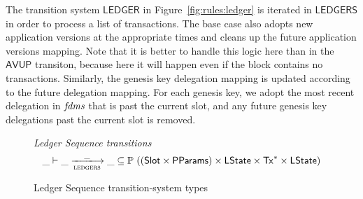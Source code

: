 \clearpage

The transition system $\mathsf{LEDGER}$ in Figure~\ref{fig:rules:ledger} is iterated
in $\mathsf{LEDGERS}$ in order to process a list of transactions.
The base case also adopts new application versions at the appropriate times
and cleans up the future application versions mapping.
Note that it is better to handle this logic here than in the $\mathsf{AVUP}$ transiton,
because here it will happen even if the block contains no transactions.
Similarly, the genesis key delegation mapping is updated according to the future delegation
mapping. For each genesis key, we adopt the most recent delegation in $\mathit{fdms}$
that is past the current slot, and any future genesis key delegations past the current
slot is removed.

\begin{figure}[htb]
  \emph{Ledger Sequence transitions}
  \begin{equation*}
    \_ \vdash
    \var{\_} \trans{ledgers}{\_} \var{\_}
    \subseteq \powerset ((\Slot\times\PParams) \times \LState \times \seqof{\Tx} \times \LState)
  \end{equation*}
  \caption{Ledger Sequence transition-system types}
  \label{fig:ts-types:ledgers}
\end{figure}

